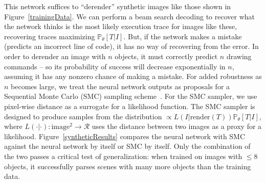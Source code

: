 \documentclass{article}
\newcommand{\probability}{\mathds{P}} %
\begin{document}
This network suffices to ``derender'' synthetic images like those shown in
Figure~\ref{trainingData}.  We can perform a beam search decoding to
recover what the network thinks is the most likely execution trace for
images like these, recovering traces maximizing $\probability_\theta
[T|I]$. But, if the network makes a mistake (predicts an incorrect
line of code), it has no way of recovering from the error.  In order
to derender an image with $n$ objects, it must correctly predict $n$
drawing commands -- so its probability of success will decrease
exponentially in $n$, assuming it has any nonzero chance of making a
mistake.  For added robustness as $n$ becomes large, we treat the
neural network outputs as proposals for a Sequential Monte Carlo (SMC) sampling scheme~\cite{SMCBook}.  For
the SMC sampler, we use pixel-wise distance as a surrogate for a
likelihood function. The SMC sampler is designed to produce samples
from the distribution $\propto L(I|\text{render}(T))
\probability_\theta[T|I]$, where $L(\cdot | \cdot):\text{image}^2\to
\mathcal{R}$ uses the distance between two images as a proxy for a
likelihood.
%
Figure~\ref{syntheticResults}
compares the neural network with SMC against the neural network by
itself or SMC by itself.  Only the combination of the two passes a
critical test of generalization: when trained on images with $\leq 8$
objects, it successfully parses scenes with many more objects than the
training data.
\end{document}
